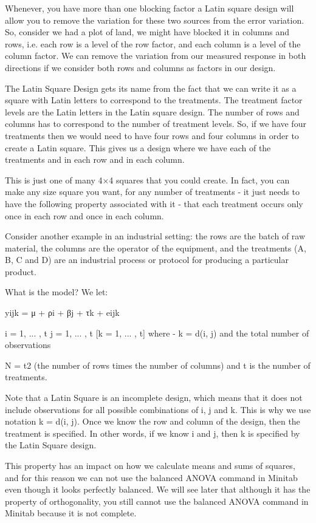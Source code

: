 \documentclass[]{article}
\begin{document}
Whenever, you have more than one blocking factor a Latin square design will allow you to remove the variation for these two sources from the error variation. So, consider we had a plot of land, we might have blocked it in columns and rows, i.e. each row is a level of the row factor, and each column is a level of the column factor. We can remove the variation from our measured response in both directions if we consider both rows and columns as factors in our design.

The Latin Square Design gets its name from the fact that we can write it as a square with Latin letters to correspond to the treatments. The treatment factor levels are the Latin letters in the Latin square design. The number of rows and columns has to correspond to the number of treatment levels. So, if we have four treatments then we would need to have four rows and four columns in order to create a Latin square. This gives us a design where we have each of the treatments and in each row and in each column.



This is just one of many 4×4 squares that you could create. In fact, you can make any size square you want, for any number of treatments - it just needs to have the following property associated with it - that each treatment occurs only once in each row and once in each column.

Consider another example in an industrial setting: the rows are the batch of raw material, the columns are the operator of the equipment, and the treatments (A, B, C and D) are an industrial process or protocol for producing a particular product.

What is the model? We let:

yijk = μ + ρi + βj + τk + eijk

i = 1, ... , t
j = 1, ... , t
[k = 1, ... , t] where - k = d(i, j) and the total number of observations

N = t2 (the number of rows times the number of columns) and t is the number of treatments.

Note that a Latin Square is an incomplete design, which means that it does not include observations for all possible combinations of i, j and k.  This is why we use notation k = d(i, j).  Once we know the row and column of the design, then the treatment is specified. In other words, if we know i and j, then k is specified by the Latin Square design.

This property has an impact on how we calculate means and sums of squares, and for this reason we can not use the balanced ANOVA command in Minitab even though it looks perfectly balanced. We will see later that although it has the property of orthogonality, you still cannot use the balanced ANOVA command in Minitab because it is not complete.
\end{document}
